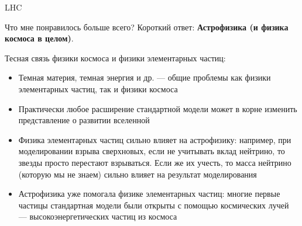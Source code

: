 \documentclass[hyperref={colorlinks,citecolor=blue,linkcolor=blue,urlcolor=blue}]{beamer}
\begin{document}
\begin{frame}{LHC}


\end{frame}


\begin{frame}{Что мне понравилось больше всего?}
    Короткий ответ: \textbf{Астрофизика (и физика космоса в целом)}.

    Тесная связь физики космоса и физики элементарных частиц:
    \begin{itemize}
        \item Темная материя, темная энергия и др. --- общие проблемы как физики элементарных частиц, так и физики космоса
        \item Практически любое расширение стандартной модели может в корне изменить представление о развитии вселенной
        \item Физика элементарных частиц сильно влияет на астрофизику: например, при моделировании взрыва сверхновых, если не учитывать вклад нейтрино, то звезды просто перестают взрываться. Если же их учесть, то масса нейтрино (которую мы не знаем) сильно влияет на результат моделирования
        \item Астрофизика уже помогала физике элементарных частиц: многие первые частицы стандартная модели были открыты с помощью космических лучей --- высокоэнергетических частиц из космоса
    \end{itemize}
\end{frame}
\end{document}
